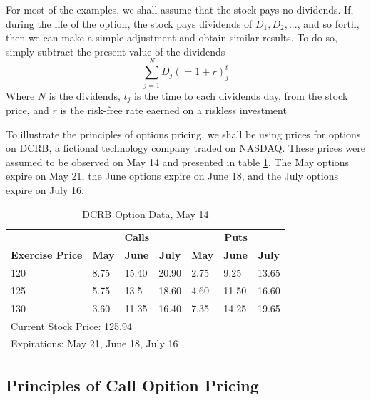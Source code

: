 \documentclass{book}
\theoremstyle{definition}
\theoremstyle{remark}
\begin{document}
        For most of the examples, we shall assume that the stock pays no dividends. If, during the life of the option, the stock pays dividends of $D_1, D_2, ... $, and so forth, then  we can make a simple adjustment and obtain similar results. To do so, simply subtract the present value of the dividends
            \begin{equation}
                \sum_{j=1}^{N} D_j( = 1+r)^t_j
            \end{equation}
        Where $N$ is the dividends, $t_j$ is the time to each dividends day, from the stock price, and $r$ is the risk-free rate eaerned on a riskless investment
        
        To illustrate the principles of options pricing, we shall be using prices for options on DCRB, a fictional technology company traded on NASDAQ. These prices were assumed to be observed on May 14 and presented in table \ref{montage}. The May options expire on May 21, the June options expire on June 18, and the July options expire on July 16.

            \begin{table}[]
            \centering
            \caption{DCRB Option Data, May 14}
            \label{montage}
                \begin{tabular}{|l|l|l|l|l|l|l|}
                    \multicolumn{1}{c}{\textbf{}} & \multicolumn{3}{c}{\textbf{Calls}} & \multicolumn{3}{c}{\textbf{Puts}} \\
                    \multicolumn{1}{c}{\textbf{Exercise Price}} & \multicolumn{1}{c}{\textbf{May}} & \multicolumn{1}{c}{\textbf{June}} & \multicolumn{1}{c}{\textbf{July}} & \multicolumn{1}{c}{\textbf{May}} & \multicolumn{1}{c}{\textbf{June}} & \multicolumn{1}{c}{\textbf{July}} \\
                    120 & 8.75 & 15.40 & 20.90 & 2.75 & 9.25 & 13.65 \\
                    125 & 5.75 & 13.5 & 18.60 & 4.60 & 11.50 & 16.60 \\
                    130 & 3.60 & 11.35 & 16.40 & 7.35 & 14.25 & 19.65 \\
                    \multicolumn{7}{l}{Current Stock Price: 125.94} \\
                    \multicolumn{7}{l}{Expirations: May 21, June 18, July 16}
                \end{tabular}
            \end{table}
    
    \subsection{Principles of Call Opition Pricing}
\end{document}
